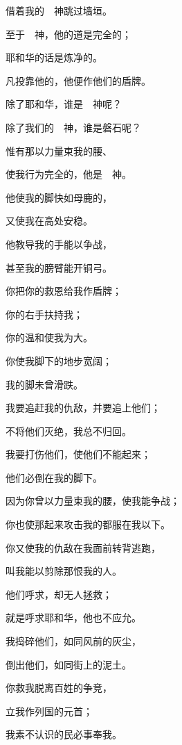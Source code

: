 {\par }{\Q 借着我的　神跳过墙垣。
\par }{\Q {}至于　神，他的道是完全的；
\par }{\Q 耶和华的话是炼净的。
\par }{\Q 凡投靠他的，他便作他们的盾牌。
\par }{\BB \par }{\Q {}除了耶和华，谁是　神呢？
\par }{\Q 除了我们的　神，谁是磐石呢？
\par }{\Q {}惟有那以力量束我的腰、
\par }{\Q 使我行为完全的，他是　神。
\par }{\Q {}他使我的脚快如母鹿的{}，
\par }{\Q 又使我在高处安稳。
\par }{\Q {}他教导我的手能以争战，
\par }{\Q 甚至我的膀臂能开铜弓。
\par }{\Q {}你把你的救恩给我作盾牌；
\par }{\Q 你的右手扶持我；
\par }{\Q 你的温和使我为大。
\par }{\Q {}你使我脚下的地步宽阔；
\par }{\Q 我的脚未曾滑跌。
\par }{\Q {}我要追赶我的仇敌，并要追上他们；
\par }{\Q 不将他们灭绝，我总不归回。
\par }{\Q {}我要打伤他们，使他们不能起来；
\par }{\Q 他们必倒在我的脚下。
\par }{\Q {}因为你曾以力量束我的腰，使我能争战；
\par }{\Q 你也使那起来攻击我的都服在我以下。
\par }{\Q {}你又使我的仇敌在我面前转背逃跑，
\par }{\Q 叫我能以剪除那恨我的人。
\par }{\Q {}他们呼求，却无人拯救；
\par }{\Q 就是呼求耶和华，他也不应允。
\par }{\Q {}我捣碎他们，如同风前的灰尘，
\par }{\Q 倒出他们，如同街上的泥土。
\par }{\BB \par }{\Q {}你救我脱离百姓的争竞，
\par }{\Q 立我作列国的元首；
\par }{\Q 我素不认识的民必事奉我。
}
